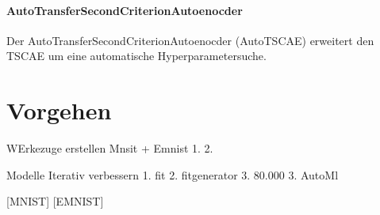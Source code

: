  	\paragraph{AutoTransferSecondCriterionAutoenocder} Der AutoTransferSecondCriterionAutoenocder (AutoTSCAE) erweitert den TSCAE um eine automatische Hyperparametersuche. 
  		
	\section{Vorgehen}
	\label{sec:Vorgehen}
	WErkezuge erstellen Mnsit + Emnist
	 1.
	 2.
	 
	Modelle Iterativ verbessern
		1. fit
		2. fitgenerator
		3. 80.000	
	3. AutoMl
		
	
	
	[MNIST] [EMNIST]
	



